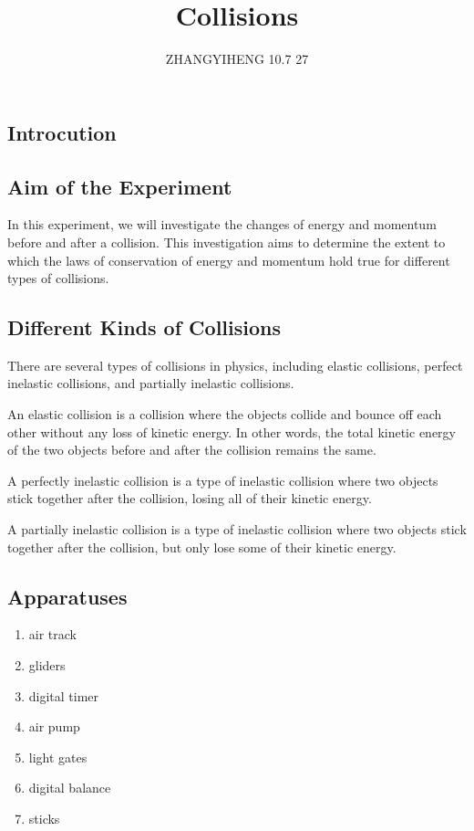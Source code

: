 \documentclass[12pt,a4paper]{article}
\author{ZHANGYIHENG 10.7 27}
\title{Collisions}
\date{}
\begin{document}
\setmainfont{Times New Roman}
\setsansfont{Times New Roman}
\begin{spacing}{1.25}
\maketitle
\tableofcontents
\setlength{\parindent}{4ex}
\newpage
\section{Introcution}
\subsection{Aim of the Experiment}
In this experiment, we will investigate the changes of energy and momentum before and after a collision. This investigation aims to determine the extent to which the laws of conservation of energy and momentum hold true for different types of collisions.
\subsection{Different Kinds of Collisions}
There are several types of collisions in physics, including elastic collisions, perfect inelastic collisions, and partially inelastic collisions.

An elastic collision is a collision where the objects collide and bounce off each other without any loss of kinetic energy. In other words, the total kinetic energy of the two objects before and after the collision remains the same.

A perfectly inelastic collision is a type of inelastic collision where two objects stick together after the collision, losing all of their kinetic energy. 

A partially inelastic collision is a type of inelastic collision where two objects stick together after the collision, but only lose some of their kinetic energy.
\subsection{Apparatuses}
\begin{enumerate}
    \setlength{\itemsep}{-1ex}
    \setlength{\parsep}{-1ex}
    \setlength{\topsep}{-1em}
    \item air track
    \item gliders
    \item digital timer
    \item air pump
    \item light gates
    \item digital balance
    \item sticks
\end{enumerate}


\end{spacing}
\end{document}
